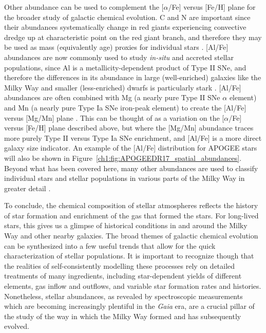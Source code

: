 Other abundance can be used to complement the [$\alpha$/Fe] versus [Fe/H] plane for the broader study of galactic chemical evolution. C and N are important since their abundances systematically change in red giants experiencing convective dredge up at characteristic point on the red giant branch, and therefore they may be used as mass (equivalently age) proxies for individual stars \parencite[e.g.][]{martig16,mackereth19a}. [Al/Fe] abundances are now commonly used to study \textit{in-situ} and accreted stellar populations, since Al is a metallicity-dependent product of Type II SNe, and therefore the differences in its abundance in large (well-enriched) galaxies like the Milky Way and smaller (less-enriched) dwarfs is particularly stark \parencite[e.g.][]{hawkins15,das20,belokurov22}. [Al/Fe] abundances are often combined with Mg (a nearly pure Type II SNe $\alpha$ element) and Mn (a nearly pure Type Ia SNe iron-peak element) to create the [Al/Fe] versus [Mg/Mn] plane \parencite[e.g.][]{hawkins15,das20,horta21a,fernandez23}. This can be thought of as a variation on the [$\alpha$/Fe] versus [Fe/H] plane described above, but where the [Mg/Mn] abundance traces more purely Type II versus Type Ia SNe enrichment, and [Al/Fe] is a more direct galaxy size indicator. An example of the [Al/Fe] distribution for APOGEE stars will also be shown in Figure~\ref{ch1:fig:APOGEEDR17_spatial_abundances}. Beyond what has been covered here, many other abundances are used to classify individual stars and stellar populations in various parts of the Milky Way in greater detail \parencite[e.g. see][]{frebel15,barbuy18}. 

To conclude, the chemical composition of stellar atmospheres reflects the history of star formation and enrichment of the gas that formed the stars. For long-lived stars, this gives us a glimpse of historical conditions in and around the Milky Way and other nearby galaxies. The broad themes of galactic chemical evolution can be synthesized into a few useful trends that allow for the quick characterization of stellar populations. It is important to recognize though that the realities of self-consistently modelling these processes rely on detailed treatments of many ingredients, including star-dependent yields of different elements, gas inflow and outflows, and variable star formation rates and histories. Nonetheless, stellar abundances, as revealed by spectroscopic measurements which are becoming increasingly plentiful in the \textit{Gaia} era, are a crucial pillar of the study of the way in which the Milky Way formed and has subsequently evolved.

